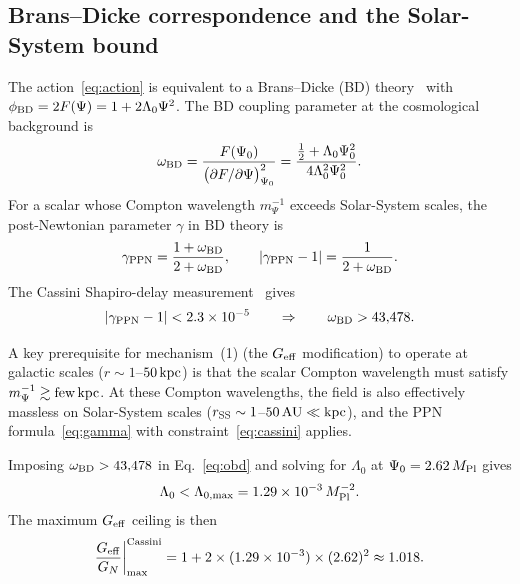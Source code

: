 \documentclass[12pt,a4paper]{article}
\theoremstyle{plain}
\newcommand{\Mpl}{M_{\rm Pl}}
\newcommand{\Geff}{G_{\rm eff}}
\newcommand{\GN}{G_N}
\newcommand{\obd}{\omega_{\rm BD}}
\begin{document}
\subsection{Brans--Dicke correspondence and the Solar-System bound}
\label{sec:geff_pn}

The action~\eqref{eq:action} is equivalent to a Brans--Dicke (BD)
theory~\cite{BransDicke1961} with $\phi_{\rm BD} = 2F(\Psi) = 1 +
2\Lambda_0\Psi^2$.  The BD coupling parameter at the cosmological
background is~\cite{Damour1992,Faraoni2004}
\begin{equation}
  \obd = \frac{F(\Psi_0)}{\bigl(\partial F/\partial\Psi\bigr)^2_{\Psi_0}}
       = \frac{\tfrac{1}{2}+\Lambda_0\Psi_0^2}{4\Lambda_0^2\Psi_0^2}.
  \label{eq:obd}
\end{equation}
For a scalar whose Compton wavelength $m_\Psi^{-1}$ exceeds Solar-System
scales, the post-Newtonian parameter $\gamma$ in BD theory is~\cite{Will2014}
\begin{equation}
  \gamma_{\rm PPN} = \frac{1+\obd}{2+\obd},
  \qquad
  |\gamma_{\rm PPN} - 1| = \frac{1}{2+\obd}.
  \label{eq:gamma}
\end{equation}
The Cassini Shapiro-delay measurement~\cite{Bertotti2003} gives
\begin{equation}
  |\gamma_{\rm PPN} - 1| < 2.3\times10^{-5}
  \qquad \Rightarrow \qquad
  \obd > 43{,}478.
  \label{eq:cassini}
\end{equation}

A key prerequisite for mechanism~(1) (the $\Geff$ modification) to
operate at galactic scales ($r \sim 1$--$50\,{\rm kpc}$) is that the
scalar Compton wavelength must satisfy $m_\Psi^{-1} \gtrsim {\rm few}\,
{\rm kpc}$.  At these Compton wavelengths, the field is also
effectively massless on Solar-System scales ($r_{\rm SS} \sim 1$--$50\,
{\rm AU} \ll {\rm kpc}$), and the PPN formula~\eqref{eq:gamma} with
constraint~\eqref{eq:cassini} applies.

Imposing $\obd > 43{,}478$ in Eq.~\eqref{eq:obd} and solving for
$\Lambda_0$ at $\Psi_0 = 2.62\,\Mpl$ gives
\begin{equation}
  \Lambda_0 < \Lambda_{0,{\rm max}} = 1.29\times10^{-3}\,\Mpl^{-2}.
  \label{eq:lz_max}
\end{equation}
The maximum $\Geff$ ceiling is then
\begin{equation}
  \frac{\Geff}{\GN}\bigg|_{\rm max}^{\rm Cassini}
    = 1 + 2\times(1.29\times10^{-3})\times(2.62)^2
    \approx 1.018.
  \label{eq:ceiling_cassini}
\end{equation}
\end{document}

